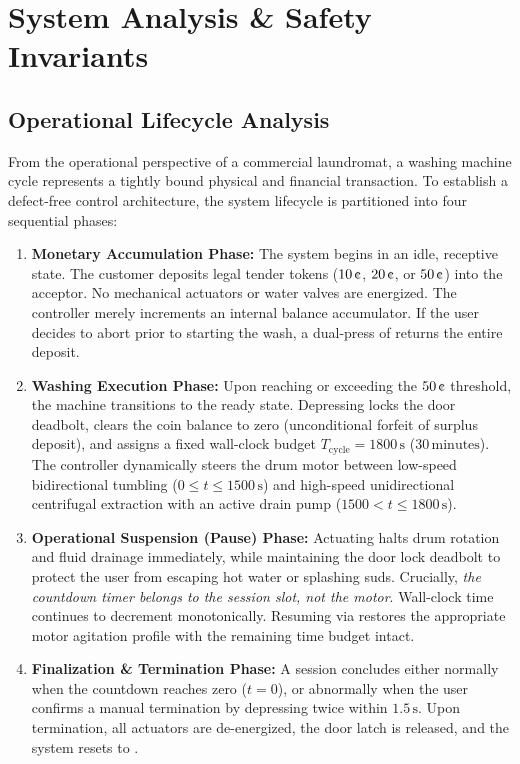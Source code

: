 \section{System Analysis \& Safety Invariants}
\label{sec:analysis}

\subsection{Operational Lifecycle Analysis}

From the operational perspective of a commercial laundromat, a washing machine cycle represents
a tightly bound physical and financial transaction. To establish a defect-free control architecture,
the system lifecycle is partitioned into four sequential phases:

\begin{enumerate}
  \item \textbf{Monetary Accumulation Phase:} The system begins in an idle, receptive state. The customer
        deposits legal tender tokens ($10\,\text{\textcent}$, $20\,\text{\textcent}$, or $50\,\text{\textcent}$)
        into the acceptor. No mechanical actuators or water valves are energized. The controller merely
        increments an internal balance accumulator. If the user decides to abort prior to starting the wash,
        a dual-press of  returns the entire deposit.
  \item \textbf{Washing Execution Phase:} Upon reaching or exceeding the $50\,\text{\textcent}$ threshold, the
        machine transitions to the ready state. Depressing  locks the door deadbolt, clears the coin
        balance to zero (unconditional forfeit of surplus deposit), and assigns a fixed wall-clock budget
        $T_{\text{cycle}} = 1800\,\text{s}$ ($30\,\text{minutes}$). The controller dynamically steers the drum
        motor between low-speed bidirectional tumbling ($0 \le t \le 1500\,\text{s}$) and high-speed unidirectional
        centrifugal extraction with an active drain pump ($1500 < t \le 1800\,\text{s}$).
  \item \textbf{Operational Suspension (Pause) Phase:} Actuating  halts drum rotation and fluid
        drainage immediately, while maintaining the door lock deadbolt to protect the user from escaping hot water
        or splashing suds. Crucially, \emph{the countdown timer belongs to the session slot, not the motor}.
        Wall-clock time continues to decrement monotonically. Resuming via  restores the appropriate
        motor agitation profile with the remaining time budget intact.
  \item \textbf{Finalization \& Termination Phase:} A session concludes either normally when the countdown reaches
        zero ($t = 0$), or abnormally when the user confirms a manual termination by depressing 
        twice within $1.5\,\text{s}$. Upon termination, all actuators are de-energized, the door latch is released,
        and the system resets to .
\end{enumerate}

